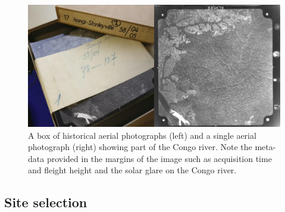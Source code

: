 \documentclass[remote sensing,article,submit,moreauthors,pdftex,10pt,a4paper]{mdpi}
\begin{document}
\begin{figure}
\includegraphics[width=1\linewidth]{./figures/print_examples} \caption{A box of historical aerial photographs (left) and a single aerial photograph (right) showing part of the Congo river. Note the meta-data provided in the margins of the image such as acquisition time and fleight height and the solar glare on the Congo river.}\label{fig:unnamed-chunk-1}
\end{figure}

\hypertarget{site-selection}{%
\subsection{Site selection}\label{site-selection}}
\end{document}
